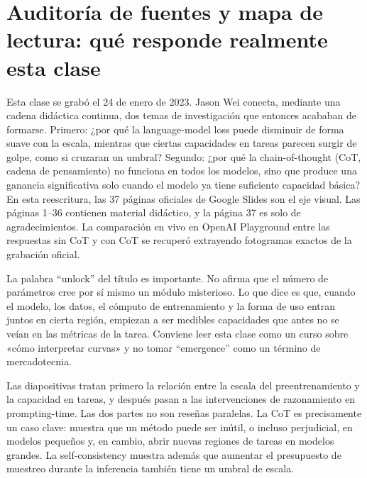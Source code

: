 \section{Auditoría de fuentes y mapa de lectura: qué responde realmente esta clase}

Esta clase se grabó el 24 de enero de 2023. Jason Wei conecta, mediante una cadena didáctica continua, dos temas de investigación que entonces acababan de formarse. Primero: ¿por qué la language-model loss puede disminuir de forma suave con la escala, mientras que ciertas capacidades en tareas parecen surgir de golpe, como si cruzaran un umbral? Segundo: ¿por qué la chain-of-thought (CoT, cadena de pensamiento) no funciona en todos los modelos, sino que produce una ganancia significativa solo cuando el modelo ya tiene suficiente capacidad básica? En esta reescritura, las 37 páginas oficiales de Google Slides son el eje visual. Las páginas 1--36 contienen material didáctico, y la página 37 es solo de agradecimientos. La comparación en vivo en OpenAI Playground entre las respuestas sin CoT y con CoT se recuperó extrayendo fotogramas exactos de la grabación oficial.


La palabra ``unlock'' del título es importante. No afirma que el número de parámetros cree por sí mismo un módulo misterioso. Lo que dice es que, cuando el modelo, los datos, el cómputo de entrenamiento y la forma de uso entran juntos en cierta región, empiezan a ser medibles capacidades que antes no se veían en las métricas de la tarea. Conviene leer esta clase como un curso sobre «cómo interpretar curvas» y no tomar ``emergence'' como un término de mercadotecnia.


Las diapositivas tratan primero la relación entre la escala del preentrenamiento y la capacidad en tareas, y después pasan a las intervenciones de razonamiento en prompting-time. Las dos partes no son reseñas paralelas. La CoT es precisamente un caso clave: muestra que un método puede ser inútil, o incluso perjudicial, en modelos pequeños y, en cambio, abrir nuevas regiones de tareas en modelos grandes. La self-consistency muestra además que aumentar el presupuesto de muestreo durante la inferencia también tiene un umbral de escala.

